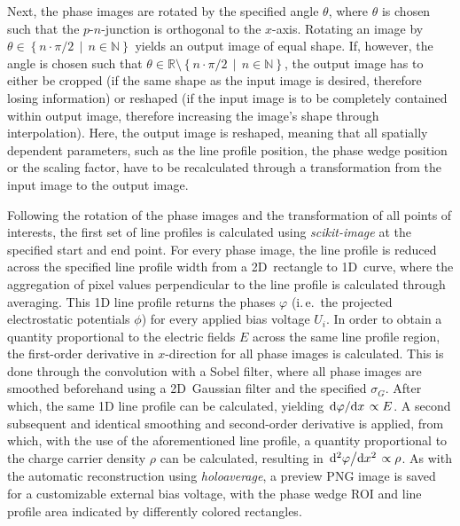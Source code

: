 Next, the phase images are rotated by the specified angle $\theta$, where $\theta$ is chosen such that the $p$-$n$-junction is orthogonal to the $x$-axis. Rotating an image by $\theta \in \left\{n \cdot \pi / 2 \, \middle| \, n \in \mathbb{N}\right\}$ yields an output image of equal shape. If, however, the angle is chosen such that $\theta \in \mathbb{R} \setminus \left\{n \cdot \pi / 2 \, \middle| \, n \in \mathbb{N}\right\}$, the output image has to either be cropped (if the same shape as the input image is desired, therefore losing information) or reshaped (if the input image is to be completely contained within output image, therefore increasing the image's shape through interpolation). Here, the output image is reshaped, meaning that all spatially dependent parameters, such as the line profile position, the phase wedge position or the scaling factor, have to be recalculated through a transformation from the input image to the output image.

Following the rotation of the phase images and the transformation of all points of interests, the first set of line profiles is calculated using \emph{scikit-image} at the specified start and end point. For every phase image, the line profile is reduced across the specified line profile width from a 2D~rectangle to 1D~curve, where the aggregation of pixel values perpendicular to the line profile is calculated through averaging. This 1D line profile returns the phases $\varphi$ (i.\,e.\ the projected electrostatic potentials $\phi$) for every applied bias voltage $U_i$. In order to obtain a quantity proportional to the electric fields $E$ across the same line profile region, the first-order derivative in $x$-direction for all phase images is calculated. This is done through the convolution with a Sobel filter, where all phase images are smoothed beforehand using a 2D~Gaussian filter and the specified $\sigma_G$. After which, the same 1D line profile can be calculated, yielding $\dv*{\varphi}{x} \propto E$. A second subsequent and identical smoothing and second-order derivative is applied, from which, with the use of the aforementioned line profile, a quantity proportional to the charge carrier density $\rho$ can be calculated, resulting in $\dv*[2]{\varphi}{x} \propto \rho$. As with the automatic reconstruction using \emph{holoaverage}, a preview PNG image is saved for a customizable external bias voltage, with the phase wedge ROI and line profile area indicated by differently colored rectangles.

